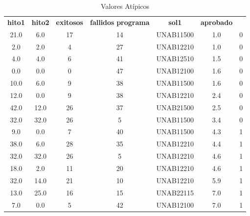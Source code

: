 \begin{table}[H]
    \centering
    \caption{Valores Atípicos}
    \begin{tabular}{ccccccc}
        \hline
        \textbf{hito1} & \textbf{hito2} & \textbf{exitosos} & \textbf{fallidos} \textbf{programa} & \textbf{sol1} & \textbf{aprobado}     \\
        21.0           & 6.0            & 17                & 14                                  & UNAB11500     & 1.0               & 0 \\
        2.0            & 2.0            & 4                 & 27                                  & UNAB12210     & 1.0               & 0 \\
        4.0            & 4.0            & 6                 & 41                                  & UNAB12510     & 1.5               & 0 \\
        0.0            & 0.0            & 0                 & 47                                  & UNAB12100     & 1.6               & 0 \\
        10.0           & 6.0            & 9                 & 38                                  & UNAB11500     & 1.6               & 0 \\
        12.0           & 0.0            & 9                 & 38                                  & UNAB12210     & 2.4               & 0 \\
        42.0           & 12.0           & 26                & 37                                  & UNAB21500     & 2.5               & 0 \\
        32.0           & 32.0           & 26                & 5                                   & UNAB11500     & 3.4               & 0 \\
        9.0            & 0.0            & 7                 & 40                                  & UNAB11500     & 4.3               & 1 \\
        38.0           & 6.0            & 28                & 35                                  & UNAB12210     & 4.4               & 1 \\
        32.0           & 32.0           & 26                & 5                                   & UNAB12210     & 4.6               & 1 \\
        18.0           & 2.0            & 11                & 20                                  & UNAB12210     & 4.6               & 1 \\
        32.0           & 14.0           & 21                & 10                                  & UNAB12210     & 5.9               & 1 \\
        13.0           & 25.0           & 16                & 15                                  & UNAB22115     & 7.0               & 1 \\
        7.0            & 0.0            & 5                 & 42                                  & UNAB12100     & 7.0               & 1 \\
        \hline
    \end{tabular}%
    \label{tab:valores_atipicos}%
\end{table}%

